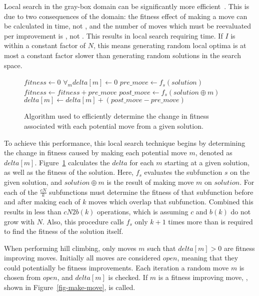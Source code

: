 Local search in the gray-box domain can be significantly more efficient~\cite{whitley:2013:greedy}. This is due
to two consequences of the domain: the fitness effect of making a move can be calculated in  time, not ,
and the number of moves which must be reevaluated per improvement is , not . This results in local
search requiring  time. If $I$ is within a constant factor of $N$, this means generating random local
optima is at most a constant factor slower than generating random solutions in the search space.

\begin{figure}
  \begin{algorithmic}[1]
    \State $fitness \leftarrow 0$
    \State $\forall_{m} delta[m] \leftarrow 0$
      \State $pre\_move \leftarrow f_s(solution)$
      \State $fitness \leftarrow fitness + pre\_move$
        \State $post\_move \leftarrow f_s(solution \oplus m)$
        \State $delta[m] \leftarrow delta[m] + (post\_move - pre\_move)$
      \EndFor
    \EndFor
  \EndProcedure
\end{algorithmic}
  \caption{Algorithm used to efficiently determine the change in fitness
           associated with each potential move from a given solution.}
  \label{fig-initialize-delta}
\end{figure}

To achieve this performance, this local search technique begins by determining the change in fitness
caused by making each potential move $m$, denoted as $delta[m]$. Figure~\ref{fig-initialize-delta}
calculates the $delta$ for each $m$ starting at a given solution, as well as the fitness of the solution.
Here, $f_s$ evaluates
the subfunction $s$ on the given solution, and $solution \oplus m$ is the result of making move $m$ on $solution$.
For each of the $\frac{cN}{k}$ subfunctions  must determine the fitness of that
subfunction before and after making each of $k$ moves which overlap that subfunction. Combined this
results in less than $cN2b(k)$ operations, which is  assuming $c$ and $b(k)$ do not grow with $N$.
Also, this procedure calls $f_s$ only $k+1$ times more than is required to find the fitness of the solution itself.

When performing hill climbing, only moves $m$ such that $delta[m] > 0$ are fitness improving moves. Initially
all moves are considered $open$, meaning that they could potentially be fitness improvements. Each iteration
a random move $m$ is chosen from $open$, and $delta[m]$ is checked. If $m$ is a fitness improving move,
, shown in Figure~\ref{fig-make-move}, is called.

